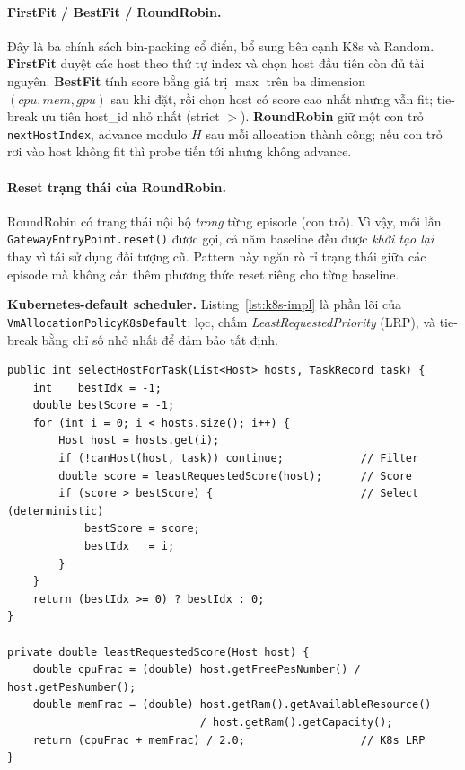 \paragraph{FirstFit / BestFit / RoundRobin.}
Đây là ba chính sách bin-packing cổ điển, bổ sung bên cạnh K8s và
Random. \textbf{FirstFit} duyệt các host theo thứ tự index và chọn
host đầu tiên còn đủ tài nguyên. \textbf{BestFit} tính score bằng
giá trị $\max$ trên ba dimension $(cpu, mem, gpu)$ sau khi đặt, rồi
chọn host có score cao nhất nhưng vẫn fit; tie-break ưu tiên host\_id
nhỏ nhất (strict $>$). \textbf{RoundRobin} giữ một con trỏ
\texttt{nextHostIndex}, advance modulo $H$ sau mỗi allocation thành
công; nếu con trỏ rơi vào host không fit thì probe tiến tới nhưng
không advance.

\paragraph{Reset trạng thái của RoundRobin.} RoundRobin có trạng thái
nội bộ \emph{trong} từng episode (con trỏ). Vì vậy, mỗi lần
\texttt{GatewayEntryPoint.reset()} được gọi, cả năm baseline đều được
\emph{khởi tạo lại} thay vì tái sử dụng đối tượng cũ. Pattern này
ngăn rò rỉ trạng thái giữa các episode mà không cần thêm phương thức
reset riêng cho từng baseline.

\textbf{Kubernetes-default scheduler.} Listing~\ref{lst:k8s-impl} là
phần lõi của \texttt{VmAllocationPolicyK8sDefault}: lọc, chấm
\textit{LeastRequestedPriority} (LRP), và tie-break bằng chỉ số nhỏ nhất
để đảm bảo tất định.

\begin{lstlisting}[style=javastyle, caption={\texttt{VmAllocationPolicyK8sDefault}
-- Filter $\to$ Score $\to$ Select.}, label={lst:k8s-impl}]
public int selectHostForTask(List<Host> hosts, TaskRecord task) {
    int    bestIdx = -1;
    double bestScore = -1;
    for (int i = 0; i < hosts.size(); i++) {
        Host host = hosts.get(i);
        if (!canHost(host, task)) continue;            // Filter
        double score = leastRequestedScore(host);      // Score
        if (score > bestScore) {                       // Select (deterministic)
            bestScore = score;
            bestIdx   = i;
        }
    }
    return (bestIdx >= 0) ? bestIdx : 0;
}

private double leastRequestedScore(Host host) {
    double cpuFrac = (double) host.getFreePesNumber() / host.getPesNumber();
    double memFrac = (double) host.getRam().getAvailableResource()
                              / host.getRam().getCapacity();
    return (cpuFrac + memFrac) / 2.0;                  // K8s LRP
}
\end{lstlisting}

